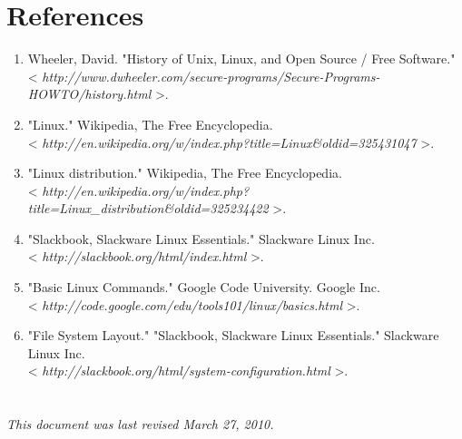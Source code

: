 \documentclass[11pt,oneside]{article}
\newcommand{\lastUpdated}{March 27, 2010}
\newenvironment{articleSectionN}[1]
{#1}
{}
\begin{document}
\section*{References}
\begin{articleSectionN}
\begin{enumerate}
\item{Wheeler, David. "History of Unix, Linux, and Open Source / Free Software."\\
< \emph{http://www.dwheeler.com/secure-programs/Secure-Programs-HOWTO/history.html} >.}
\item{"Linux." Wikipedia, The Free Encyclopedia.\\
< \emph{http://en.wikipedia.org/w/index.php?title=Linux\&oldid=325431047} >. }
\item{"Linux distribution." Wikipedia, The Free Encyclopedia.\\
< \emph{http://en.wikipedia.org/w/index.php?title=Linux\_distribution\&oldid=325234422} >. }
\item{"Slackbook, Slackware Linux Essentials." Slackware Linux Inc. \\
< \emph{http://slackbook.org/html/index.html} >.}
\item{"Basic Linux Commands." Google Code University. Google Inc.\\
< \emph{http://code.google.com/edu/tools101/linux/basics.html} >. }
\item{"File System Layout." "Slackbook, Slackware Linux Essentials." Slackware Linux Inc.\\
< \emph{http://slackbook.org/html/system-configuration.html} >. }
\end{enumerate}
\end{articleSectionN}

\section*{}
\emph{This document was last revised \lastUpdated.}
\end{document}

